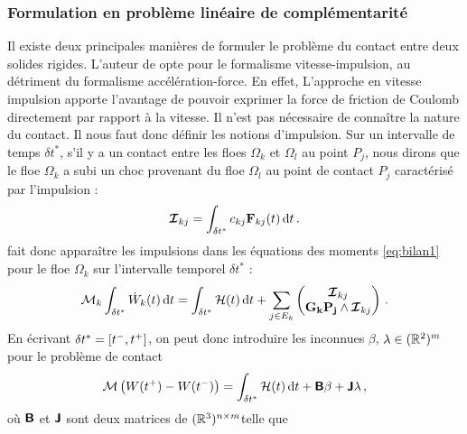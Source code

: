 \subsubsection{Formulation en problème linéaire de complémentarité}

Il existe deux principales manières de formuler le problème du contact entre deux solides rigides. L'auteur de \parencite{rabatel2015thesis} opte pour le formalisme vitesse-impulsion, au détriment du formalisme accélération-force. En effet, L’approche en vitesse impulsion apporte l’avantage de pouvoir exprimer la force de friction de Coulomb directement par rapport à la vitesse. Il n’est pas nécessaire de connaître la nature du contact. Il nous faut donc définir les notions d'impulsion. Sur un intervalle de temps $\delta t^*$, s’il y a un contact entre les floes $\Omega_k$ et $\Omega_l$ au point $P_j$, nous dirons que le floe $\Omega_k$ a subi un choc provenant du floe $\Omega_l$ au point de contact $P_j$ caractérisé par l’impulsion :
$$
\bvec{\mathcal{I}}_{kj} = \int_{\delta t^*} c_{kj} \bvec{F}_{kj}(t) \diff t \,.
$$ 
\citeauthor{rabatel2015thesis} fait donc apparaître les impulsions dans les équations des moments \cref{eq:bilan1} pour le floe $\Omega_k$ sur l’intervalle temporel $\delta t^*$ :
$$
\mathcal{M}_k \int_{\dtstar} \dot{W}_k(t) \diff t = \int_{\dtstar} \mathcal{H}(t) \diff t + \sum_{j \in E_k} \begin{pmatrix}
    \bvec{\mathcal{I}}_{kj} \\ \bvec{G_kP_j} \wedge \bvec{\mathcal{I}}_{kj} 
\end{pmatrix} \,.
$$
En écrivant $\delta t^* = [t^{-}, t^{+}]$, on peut donc introduire les inconnues $\beta$, $\lambda \in (\mathbb{R}^2)^m$ pour le problème de contact  
\begin{align}
    \mathcal{M} \left( W(t^{+}) - W(t^{-}) \right) = \int_{\dtstar} \mathcal{H}(t) \diff t + \bmat{B}\beta + \bmat{J}\lambda \,,
\end{align}
où $\bm{\mathsf{B}}$ et $\bm{\mathsf{J}}$ sont deux matrices de $(\mathbb{R}^3)^{n \times m}$telle que
